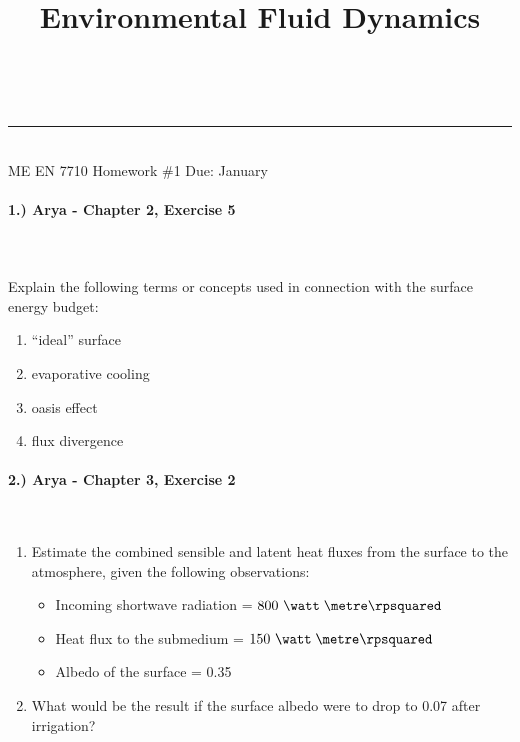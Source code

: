 \documentclass[11pt]{article}
\makeatletter
\newcommand{\linia}{\rule{\linewidth}{0.5pt}}
\renewcommand{\maketitle}{
\begin{center}
\vspace{2ex}
{\huge \textsc{\@title}}
\vspace{1ex}
\\
\linia\\
ME EN 7710 \hfill Homework \#1 \hfill Due: January \nth{24}
\vspace{4ex}
\end{center}
}
\makeatother
\begin{document}
\title{Environmental Fluid Dynamics}

\maketitle

\vspace{-20pt}
\paragraph{1.) Arya - Chapter 2, Exercise 5}~\\\\
Explain the following terms or concepts used in connection with the surface energy budget:
\begin{enumerate}[label=(\alph*)]
	\item ``ideal'' surface
	\item evaporative cooling
	\item oasis effect
	\item flux divergence
\end{enumerate}
 
\paragraph{2.) Arya - Chapter 3, Exercise 2}~\\
\begin{enumerate}[label=(\alph*),topsep=-10pt]
	\item Estimate the combined sensible and latent heat fluxes from the surface to the atmosphere, given the following observations:
\vspace{-10pt}
\begin{itemize}
	\item Incoming shortwave radiation = $800\ \watt\; \metre\rpsquared$
	\item Heat flux to the submedium = $150\ \watt\; \metre\rpsquared$
	\item Albedo of the surface = 0.35
\end{itemize}
	\item What would be the result if the surface albedo were to drop to 0.07 after irrigation?
\end{enumerate}

\end{document}
